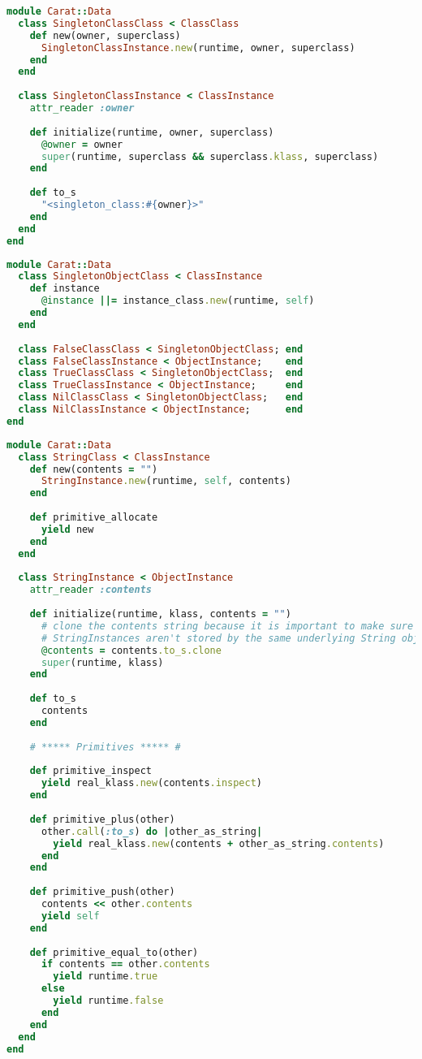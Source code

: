 \begin{lstlisting}[title={\small\ttfamily\bfseries data/singleton\_class.rb},language=Ruby]
module Carat::Data
  class SingletonClassClass < ClassClass
    def new(owner, superclass)
      SingletonClassInstance.new(runtime, owner, superclass)
    end
  end
  
  class SingletonClassInstance < ClassInstance
    attr_reader :owner
    
    def initialize(runtime, owner, superclass)
      @owner = owner
      super(runtime, superclass && superclass.klass, superclass)
    end
    
    def to_s
      "<singleton_class:#{owner}>"
    end
  end
end

\end{lstlisting}
\begin{lstlisting}[title={\small\ttfamily\bfseries data/singletons.rb},language=Ruby]
module Carat::Data
  class SingletonObjectClass < ClassInstance
    def instance
      @instance ||= instance_class.new(runtime, self)
    end
  end
  
  class FalseClassClass < SingletonObjectClass; end
  class FalseClassInstance < ObjectInstance;    end
  class TrueClassClass < SingletonObjectClass;  end
  class TrueClassInstance < ObjectInstance;     end
  class NilClassClass < SingletonObjectClass;   end
  class NilClassInstance < ObjectInstance;      end
end

\end{lstlisting}
\begin{lstlisting}[title={\small\ttfamily\bfseries data/string.rb},language=Ruby]
module Carat::Data
  class StringClass < ClassInstance
    def new(contents = "")
      StringInstance.new(runtime, self, contents)
    end
  
    def primitive_allocate
      yield new
    end
  end
  
  class StringInstance < ObjectInstance
    attr_reader :contents
  
    def initialize(runtime, klass, contents = "")
      # clone the contents string because it is important to make sure that two separate 
      # StringInstances aren't stored by the same underlying String object
      @contents = contents.to_s.clone
      super(runtime, klass)
    end
    
    def to_s
      contents
    end
    
    # ***** Primitives ***** #
    
    def primitive_inspect
      yield real_klass.new(contents.inspect)
    end
    
    def primitive_plus(other)
      other.call(:to_s) do |other_as_string|
        yield real_klass.new(contents + other_as_string.contents)
      end
    end
    
    def primitive_push(other)
      contents << other.contents
      yield self
    end
    
    def primitive_equal_to(other)
      if contents == other.contents
        yield runtime.true
      else
        yield runtime.false
      end
    end
  end
end

\end{lstlisting}
